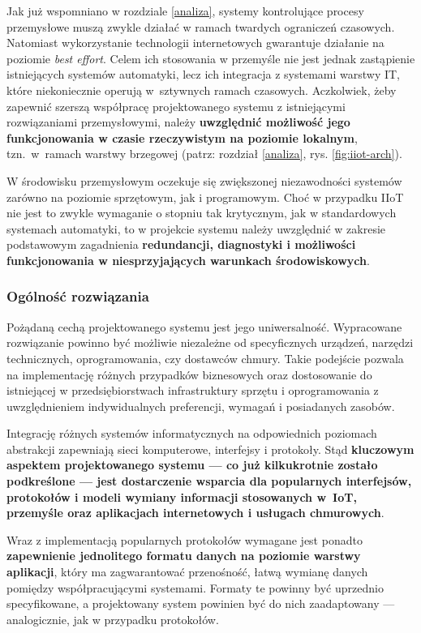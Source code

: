 \documentclass[a4paper, 12pt, twoside]{article}
\begin{document}
Jak już wspomniano w rozdziale \ref{analiza}, systemy kontrolujące
procesy przemysłowe muszą zwykle działać w ramach twardych ograniczeń czasowych.
Natomiast wykorzystanie technologii internetowych gwarantuje działanie na poziomie
\emph{best effort}. Celem ich stosowania w przemyśle nie jest jednak zastąpienie
istniejących systemów automatyki, lecz ich integracja z systemami warstwy IT,
które niekoniecznie operują w~sztywnych ramach czasowych.
Aczkolwiek, żeby zapewnić szerszą współpracę projektowanego systemu
z istniejącymi rozwiązaniami przemysłowymi, należy \textbf{uwzględnić możliwość jego funkcjonowania
      w czasie rzeczywistym na poziomie lokalnym}, tzn.~w~ramach warstwy brzegowej
(patrz: rozdział \ref{analiza}, rys. \ref{fig:iiot-arch}).

W środowisku przemysłowym oczekuje się zwiększonej niezawodności systemów
zarówno na poziomie sprzętowym, jak i programowym. Choć w przypadku IIoT nie jest
to zwykle wymaganie o stopniu tak krytycznym, jak w standardowych systemach automatyki,
to w projekcie systemu należy uwzględnić w zakresie podstawowym
zagadnienia \textbf{redundancji, diagnostyki i możliwości funkcjonowania w niesprzyjających
      warunkach środowiskowych}.

\subsubsection{Ogólność rozwiązania}

Pożądaną cechą projektowanego systemu jest jego uniwersalność. Wypracowane rozwiązanie
powinno być możliwie niezależne od specyficznych urządzeń, narzędzi technicznych,
oprogramowania, czy dostawców chmury. Takie podejście pozwala na implementację różnych przypadków biznesowych
oraz dostosowanie do istniejącej w przedsiębiorstwach infrastruktury sprzętu i oprogramowania
z uwzględnieniem indywidualnych preferencji, wymagań i posiadanych zasobów.

Integrację różnych systemów informatycznych na odpowiednich poziomach abstrakcji
zapewniają sieci komputerowe, interfejsy i protokoły.
Stąd \textbf{kluczowym aspektem projektowanego systemu --- co już kilkukrotnie zostało podkreślone ---
      jest dostarczenie wsparcia dla popularnych
      interfejsów, protokołów i modeli wymiany informacji stosowanych w~IoT, przemyśle oraz
      aplikacjach internetowych i usługach chmurowych}.

Wraz z implementacją popularnych protokołów wymagane jest ponadto \textbf{zapewnienie
      jednolitego formatu danych na poziomie warstwy aplikacji}, który ma zagwarantować przenośność,
łatwą wymianę danych pomiędzy współpracującymi systemami. Formaty
te powinny być uprzednio specyfikowane, a projektowany system powinien być do
nich zaadaptowany --- analogicznie, jak w przypadku protokołów.
\end{document}
